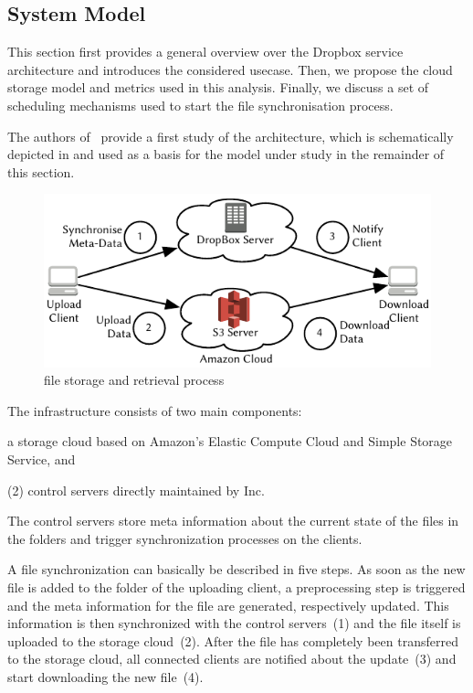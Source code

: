 \subsection{System Model}\label{sec:application:cloud_file_synchronisation:system_model}
This section first provides a general overview over the Dropbox service architecture and introduces the considered usecase.
Then, we propose the cloud storage model and metrics used in this analysis.
Finally, we discuss a set of scheduling mechanisms used to start the file synchronisation process. 

The authors of~\cite{Drago2012} provide a first study of the \dropbox architecture, which is schematically depicted in  and used as a basis for the model under study in the remainder of this section.

\begin{figure}
  \centering
  \includegraphics[width=\columnwidth]{application/cloud_file_synchronization/system_model/figures/dropbox_architecture}
  \caption{\dropbox file storage and retrieval process}
  \label{fig:application:cloud_file_synchronisation:system_model:dropbox_architecture}
\end{figure}

The \dropbox infrastructure consists of two main components:
\begin{enumerate*}
\item a storage cloud based on Amazon's Elastic Compute Cloud and Simple Storage Service, and 
\item (2) control servers directly maintained by \dropbox Inc. 
\end{enumerate*}

The control servers store meta information about the current state of the files in the \dropbox folders and trigger synchronization processes on the clients.

A file synchronization can basically be described in five steps.
As soon as the new file is added to the \dropbox folder of the uploading client, a preprocessing step is triggered and the meta information for the file are generated, respectively updated.
This information is then synchronized with the control servers~(1) and the file itself is uploaded to the storage cloud~(2).
After the file has completely been transferred to the storage cloud, all connected clients are notified about the update~(3) and start downloading the new file~(4).

